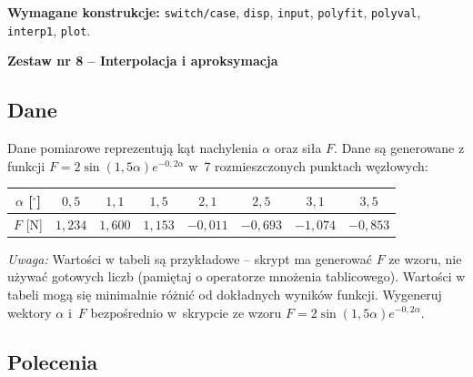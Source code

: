 \documentclass[a4paper,11pt]{article}
\begin{document}
\vspace{0.3cm}
\begin{ramka}
\textbf{Wymagane konstrukcje:}
\texttt{switch/case}, \texttt{disp}, \texttt{input}, \texttt{polyfit}, \texttt{polyval}, \texttt{interp1}, \texttt{plot}.
\end{ramka}

\clearpage
\begin{center}
  {\large\bfseries Zestaw nr 8 \quad -- \quad Interpolacja i aproksymacja}
\end{center}
\hrulefill
\vspace{0.4cm}

\subsection*{Dane}

Dane pomiarowe reprezentują kąt nachylenia $\alpha$ oraz siła $F$.
Dane są generowane z funkcji $F = 2\sin(1{,}5\alpha)e^{-0{,}2\alpha}$ w~7 rozmieszczonych punktach węzłowych:

\begin{center}
\begin{tabular}{c|ccccccc}
  \toprule
  $\alpha$ [$^\circ$] & $0{,}5$ & $1{,}1$ & $1{,}5$ & $2{,}1$ & $2{,}5$ & $3{,}1$ & $3{,}5$ \\
  \midrule
  $F$ [$\text{N}$] & $1{,}234$ & $1{,}600$ & $1{,}153$ & $-0{,}011$ & $-0{,}693$ & $-1{,}074$ & $-0{,}853$ \\
  \bottomrule
\end{tabular}
\end{center}

\medskip
\textit{Uwaga:} Wartości w tabeli są przykładowe – skrypt ma generować $F$ ze wzoru, nie używać gotowych liczb (pamiętaj o operatorze mnożenia tablicowego). Wartości w tabeli mogą się minimalnie różnić od dokładnych wyników funkcji.
Wygeneruj wektory $\alpha$ i~$F$ bezpośrednio w~skrypcie ze wzoru $F = 2\sin(1{,}5\alpha)e^{-0{,}2\alpha}$.

\subsection*{Polecenia}
\end{document}
